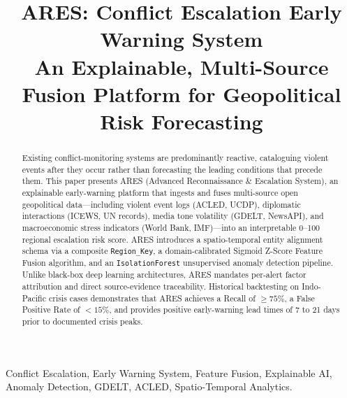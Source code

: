 \documentclass[conference]{IEEEtran}
\begin{document}
\title{ARES: Conflict Escalation Early Warning System\\
\large An Explainable, Multi-Source Fusion Platform for Geopolitical Risk Forecasting}

\author{
}

\maketitle

\begin{abstract}
Existing conflict-monitoring systems are predominantly reactive, cataloguing violent events after they occur rather than forecasting the leading conditions that precede them. This paper presents ARES (Advanced Reconnaissance \& Escalation System), an explainable early-warning platform that ingests and fuses multi-source open geopolitical data—including violent event logs (ACLED, UCDP), diplomatic interactions (ICEWS, UN records), media tone volatility (GDELT, NewsAPI), and macroeconomic stress indicators (World Bank, IMF)—into an interpretable 0--100 regional escalation risk score. ARES introduces a spatio-temporal entity alignment schema via a composite \texttt{Region\_Key}, a domain-calibrated Sigmoid Z-Score Feature Fusion algorithm, and an \texttt{IsolationForest} unsupervised anomaly detection pipeline. Unlike black-box deep learning architectures, ARES mandates per-alert factor attribution and direct source-evidence traceability. Historical backtesting on Indo-Pacific crisis cases demonstrates that ARES achieves a Recall of $\ge 75\%$, a False Positive Rate of $< 15\%$, and provides positive early-warning lead times of 7 to 21 days prior to documented crisis peaks.
\end{abstract}

\begin{IEEEkeywords}
Conflict Escalation, Early Warning System, Feature Fusion, Explainable AI, Anomaly Detection, GDELT, ACLED, Spatio-Temporal Analytics.
\end{IEEEkeywords}
\end{document}
